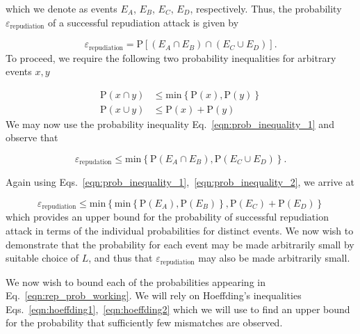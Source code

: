 \noindent which we denote as events $E_A$, $E_B$, $E_C$, $E_D$, respectively. 
Thus, the probability $\varepsilon_{\text{repudiation}}$ of a successful repudiation attack is given by

\begin{equation}
\varepsilon_{\text{repudiation}} = \text{P}\left[\left(E_A \cap E_B\right) \cap \left(E_C \cup E_D\right)\right].
\end{equation}
To proceed, we require the following two probability inequalities for arbitrary events $x, y$

\begin{align}
\label{eqn:prob_inequality_1}
\text{P}\left(x \cap y\right) &\le \text{min}\left\{\text{P}\left(x\right), \text{P}\left(y\right)\right\} \\
\label{eqn:prob_inequality_2}
\text{P}\left(x \cup y\right) &\le \text{P}\left(x\right) + \text{P}\left(y\right)
\end{align}
\noindent We may now use the probability inequality Eq.~\ref{eqn:prob_inequality_1} and observe that 

\begin{equation}
\varepsilon_{\text{repudation}} \le \text{min}\left\{\text{P}\left(E_A \cap E_B\right), \text{P}\left(E_C \cup E_D\right)\right\}.
\end{equation}

\noindent Again using Eqs.~\ref{eqn:prob_inequality_1},~\ref{eqn:prob_inequality_2}, we arrive at

\begin{equation}\label{eqn:rep_prob_working}
\varepsilon_{\text{repudiation}} \le \text{min}\left\{
\text{min}\left\{\text{P}\left(E_A\right), \text{P}\left(E_B\right) \right\}, \text{P}\left(E_C\right) + \text{P}\left(E_D\right)\right\}
\end{equation}
which provides an upper bound for the probability of successful repudiation attack in terms of the individual probabilities for distinct events. We now wish to demonstrate that the probability for each event may be made arbitrarily small by suitable choice of $L$, and thus that $\varepsilon_{\text{repudiation}}$ may also be made arbitrarily small.


We now wish to bound each of the probabilities appearing in Eq.~\ref{eqn:rep_prob_working}. We will rely on Hoeffding's inequalities Eqs.~\ref{eqn:hoeffding1},~\ref{eqn:hoeffding2} which we will use to find an upper bound for the probability that sufficiently few mismatches are observed.

